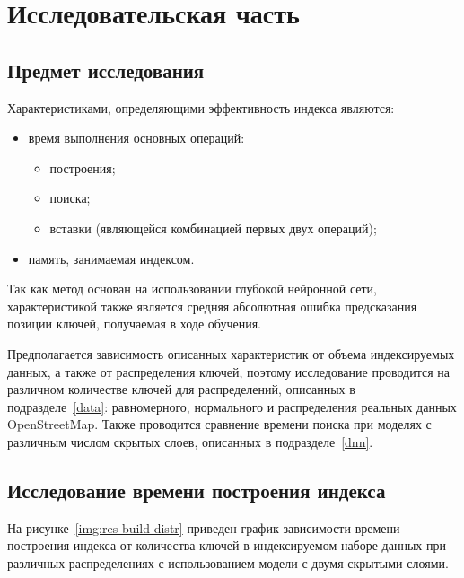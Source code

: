 \chapter{\label{research}Исследовательская часть}

\section{Предмет исследования}

Характеристиками, определяющими эффективность индекса являются:

\begin{itemize}
    \item время выполнения основных операций:
\begin{itemize}[wide=\dimexpr\parindent-2em+\relax, leftmargin=* ]
    \item построения;
    \item поиска;
    \item вставки (являющейся
        комбинацией первых двух операций);
\end{itemize}
    \item память, занимаемая индексом.
\end{itemize}

Так как метод основан на использовании глубокой нейронной сети,
характеристикой также является средняя абсолютная ошибка предсказания позиции
ключей, получаемая в ходе обучения.

Предполагается зависимость описанных характеристик от объема индексируемых
данных, а также от распределения ключей, поэтому исследование проводится на
различном количестве ключей для распределений, описанных в
подразделе~\ref{data}: равномерного, нормального и распределения реальных данных
OpenStreetMap. Также проводится сравнение времени поиска при моделях с различным
числом скрытых слоев, описанных в подразделе~\ref{dnn}.

\section{Исследование времени построения индекса}

На рисунке~\ref{img:res-build-distr} приведен график зависимости времени
построения индекса от количества ключей в индексируемом наборе данных при
различных распределениях с использованием модели с двумя скрытыми слоями.


